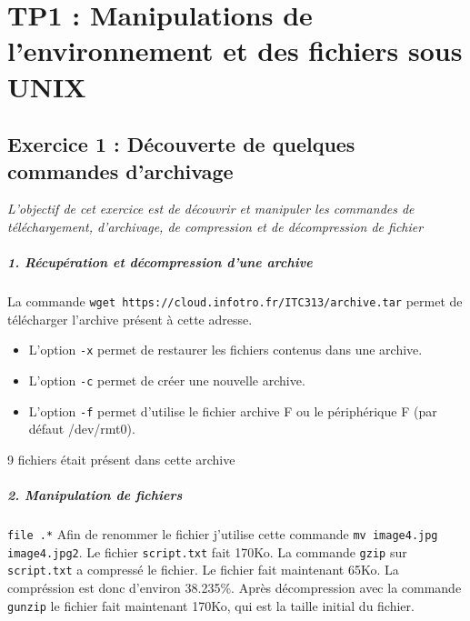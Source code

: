 \chapter{TP1 : Manipulations de l’environnement et des fichiers sous UNIX}

\section{Exercice 1 : Découverte de quelques commandes d'archivage}
\textit{L'objectif de cet exercice est de découvrir et manipuler les commandes de téléchargement, d'archivage, de compression et de décompression de fichier}

\paragraph{1. Récupération et décompression d'une archive}
La commande \texttt{wget https://cloud.infotro.fr/ITC313/archive.tar} permet de télécharger l'archive présent à cette adresse.
\begin{itemize}
\item L'option \texttt{-x} permet de restaurer les fichiers contenus dans une archive.
\item L'option \texttt{-c} permet de créer une nouvelle archive.
\item L'option \texttt{-f} permet d'utilise le fichier archive F ou le périphérique F (par défaut /dev/rmt0).
\end{itemize}
9 fichiers était présent dans cette archive

\paragraph{2. Manipulation de fichiers}
\texttt{file .\/*}
Afin de renommer le fichier j'utilise cette commande \texttt{mv image4.jpg image4.jpg2}.
Le fichier \texttt{script.txt} fait 170Ko.
La commande \texttt{gzip} sur \texttt{script.txt} a compressé le fichier.
Le fichier fait maintenant  65Ko.
La compréssion est donc d'environ 38.235\%.
Après décompression avec la commande \texttt{gunzip} le fichier fait maintenant 170Ko, qui est la taille initial du fichier.

